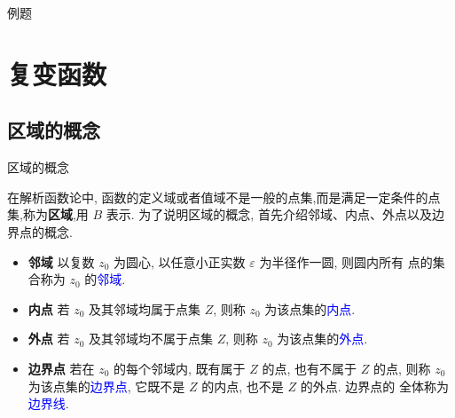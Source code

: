 \documentclass[fontset=windows, chinese, 10pt]{beamer}
\newcommand{\blue}[1]{\textcolor{blue}{#1}}
\begin{document}
  \begin{frame}{例题}

\onslide<2->{
    \begin{solution}
%  
          \begin{align*}
              \Re \frac{1}{z} &= 2\\
              \Re \frac{1}{x+\imath y} &  = 2 \\
              \frac{x}{x^2 +y^2} & = 2 .
          \end{align*}
      因此,我们得到方程
      \[
          (x-\frac{1}{4})^2 + y^2 = \left( \frac{1}{4}\right)^2,
      \]
      它表示以$(\frac{1}{4},0)$为圆心,$\frac{1}{4}$为半径的圆上各点集合.
      \end{solution}
}
  \end{frame}
  

  \section{复变函数}

  \subsection{区域的概念}

\begin{frame}{区域的概念}

  在解析函数论中, 函数的定义域或者值域不是一般的点集,而是满足一定条件的点集,称为{\bf 区域},用 $B$ 表示.
为了说明区域的概念, 首先介绍邻域、内点、外点以及边界点的概念.

\begin{itemize}
\item {\bf 邻域} \quad 以复数 $z_0$ 为圆心, 以任意小正实数 $\varepsilon$ 为半径作一圆, 则圆内所有 点的集合称为 $z_0$ 的\blue{邻域}.
\item {\bf 内点} \quad 若 $z_0$ 及其邻域均属于点集 $Z$, 则称 $z_0$ 为该点集的\blue{内点}.
\item {\bf 外点} \quad 若 $z_0$ 及其邻域均不属于点集 $Z$, 则称 $z_0$ 为该点集的\blue{外点}.
\item {\bf 边界点}  \quad 若在 $z_0$ 的每个邻域内, 既有属于 $Z$ 的点, 也有不属于 $Z$ 的点, 
        则称 $z_0$ 为该点集的\blue{边界点}, 它既不是 $Z$ 的内点, 也不是 $Z$ 的外点. 边界点的 全体称为\blue{边界线}.
\end{itemize}
\end{frame}
\end{document}
